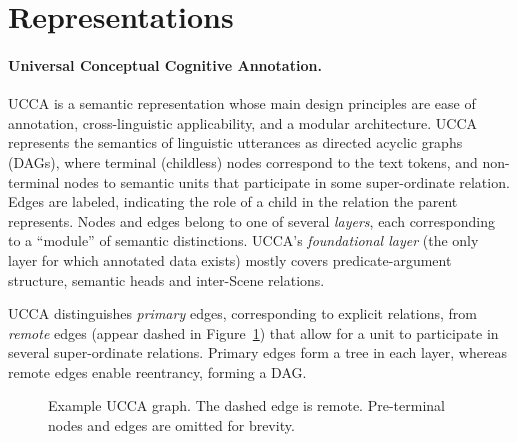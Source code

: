 \documentclass[11pt,a4paper]{article}
\begin{document}
\section{Representations}\label{sec:representations}

\paragraph{Universal Conceptual Cognitive Annotation.}\label{sec:ucca}
UCCA \cite{abend2013universal} is a semantic representation whose main design principles
are ease of annotation, cross-linguistic applicability, and a modular architecture.
UCCA represents the semantics of linguistic utterances
as directed acyclic graphs (DAGs), where terminal (childless) nodes
correspond to the text tokens, and non-terminal nodes to semantic units that participate
in some super-ordinate relation.
Edges are labeled, indicating the role of a child in the relation the parent represents.
Nodes and edges belong to one of several \textit{layers}, each corresponding
to a ``module'' of semantic distinctions.
UCCA's \textit{foundational layer} (the only layer for which annotated data exists)
mostly covers predicate-argument structure, semantic heads and inter-Scene relations.

UCCA distinguishes \textit{primary} edges, corresponding 
to explicit relations, from \textit{remote} edges (appear dashed in
Figure~\ref{fig:example_ucca}) that allow for a unit to participate
in several super-ordinate relations.
Primary edges form a tree in each layer, whereas remote edges enable reentrancy, forming a DAG.


\begin{figure}[!ht]
  \centering
\caption{\label{fig:example_ucca}
 Example UCCA graph. The dashed edge is remote.
  Pre-terminal nodes and edges are omitted for brevity.}
\end{figure}
\end{document}
